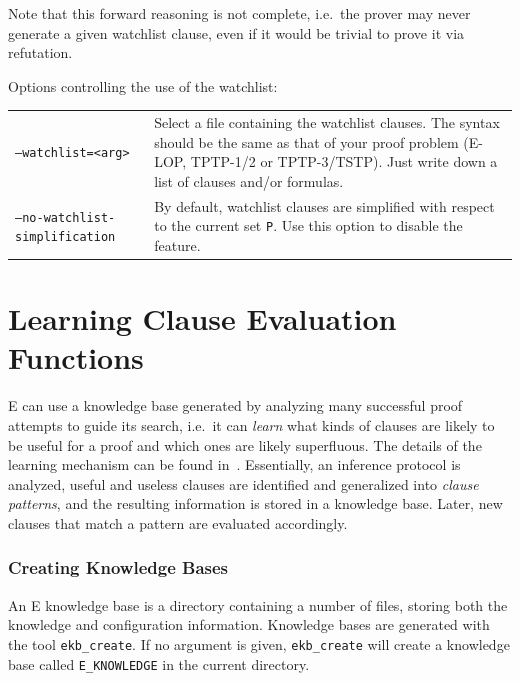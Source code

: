 \documentclass{report}
\begin{document}
Note that this forward reasoning is not complete, i.e.\ the prover may
never generate a given watchlist clause, even if it would be trivial
to prove it via refutation.

Options controlling the use of the watchlist:\\
\begin{tabular}{lp{5.8cm}}
  \texttt{--watchlist=<arg>}\index{watchlist@\texttt{--watchlist}} & Select a file containing the watchlist
  clauses. The syntax should be the same as that of your proof problem
  (E-LOP\index{LOP}, TPTP-1/2 or
  TPTP-3/TSTP\index{TPTP!language}). Just write down a list of
  clauses and/or formulas.\\
  \texttt{--no-watchlist-simplification}\index{no-watchlist-simplification@\texttt{--no-watchlist-simplification}} & By default, watchlist
  clauses are simplified with respect to the current set
  \texttt{P}. Use this option to disable the feature.
\end{tabular}


\section{Learning Clause Evaluation Functions}
\label{sec:options:learning}

E can use a knowledge base generated by analyzing many successful
proof attempts to guide its search, i.e.\ it can \emph{learn} what
kinds of clauses are likely to be useful for a proof and which ones
are likely superfluous. The details of the learning mechanism can be
found in~\cite{Schulz:Diss-2000,Schulz:KI-2001}. Essentially, an
inference protocol is analyzed, useful and useless clauses are
identified and generalized into \emph{clause patterns}, and the
resulting information is stored in a knowledge base. Later, new clauses
that match a pattern are evaluated accordingly.

\subsubsection{Creating Knowledge Bases}

An E knowledge base is a directory containing a number of files,
storing both the knowledge and configuration information. Knowledge
bases are generated with the tool \texttt{ekb\_create}. If no argument
is given, \texttt{ekb\_create} will create a knowledge base called
\texttt{E\_KNOWLEDGE} in the current directory.
\end{document}
